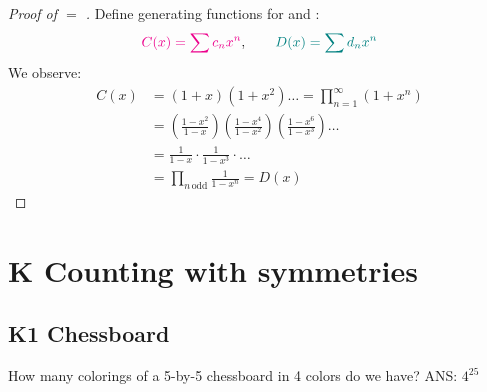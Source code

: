 \documentclass[12pt]{article}
\begin{document}
\begin{proof}[Proof of \rt{\#} $=$ \gt{\#}]
    Define generating functions for  and : \[\textcolor{magenta}{C(x)=\sum c_nx^n}, \qquad \textcolor{teal}{D(x)=\sum d_nx^n}\]
    We observe: \begin{align*}
        C(x) &= (1+x)(1+x^2)\dots = \prod_{n=1}^{\infty}(1+x^n)\\
        &= \left(\frac{1-x^2}{1-x}\right)\left(\frac{1-x^4}{1-x^2}\right)\left(\frac{1-x^6}{1-x^3}\right)\dots\\
        &= \frac{1}{1-x}\cdot\frac{1}{1-x^3}\cdot\dots\\
        &= \prod_{n \, \mathrm{odd}} \frac{1}{1-x^n}=D(x)
    \end{align*}
\end{proof}

\section{K Counting with symmetries}
\subsection{K1 Chessboard}
How many colorings of a 5-by-5 chessboard in 4 colors do we have? \hfill ANS: $4^{25}$
\end{document}
